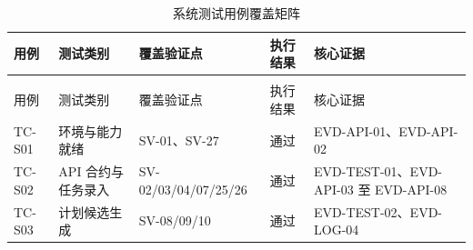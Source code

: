 {%
\begin{longtable}{@{}
  >{\centering\arraybackslash}p{}
  >{\centering\arraybackslash}p{}
  >{\centering\arraybackslash}p{}
  >{\centering\arraybackslash}p{}
  >{\centering\arraybackslash}p{}@{}}
\caption{系统测试用例覆盖矩阵}\label{tab:6-1}\\
\toprule
\begin{minipage}[b]{\linewidth}\centering
用例
\end{minipage} & \begin{minipage}[b]{\linewidth}\centering
测试类别
\end{minipage} & \begin{minipage}[b]{\linewidth}\centering
覆盖验证点
\end{minipage} & \begin{minipage}[b]{\linewidth}\centering
执行结果
\end{minipage} & \begin{minipage}[b]{\linewidth}\centering
核心证据
\end{minipage} \\
\midrule
\endfirsthead
\multicolumn{5}{r}{表\thetable（续表）} \\
\toprule
\begin{minipage}[b]{\linewidth}\centering
用例
\end{minipage} & \begin{minipage}[b]{\linewidth}\centering
测试类别
\end{minipage} & \begin{minipage}[b]{\linewidth}\centering
覆盖验证点
\end{minipage} & \begin{minipage}[b]{\linewidth}\centering
执行结果
\end{minipage} & \begin{minipage}[b]{\linewidth}\centering
核心证据
\end{minipage} \\
\midrule
\endhead
\midrule
\endfoot
\bottomrule
\endlastfoot
TC-S01 & 环境与能力就绪 & SV-01、SV-27 & 通过 &
EVD-API-01、EVD-API-02 \\
TC-S02 & API 合约与任务录入 & SV-02/03/04/07/25/26 & 通过 &
EVD-TEST-01、EVD-API-03 至 EVD-API-08 \\
TC-S03 & 计划候选生成 & SV-08/09/10 & 通过 & EVD-TEST-02、EVD-LOG-04 \\

\end{longtable}}
